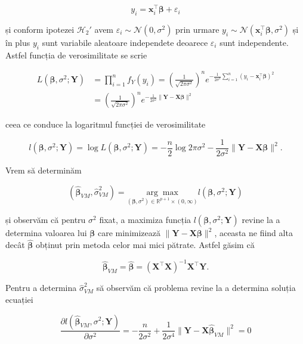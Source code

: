 \documentclass[]{article}
\begin{document}
\[
  y_i = \boldsymbol x_i^\intercal\boldsymbol\beta + \varepsilon_i
\]

și conform ipotezei \(\mathcal{H}_2'\) avem
\(\varepsilon_i\sim\mathcal{N}(0, \sigma^2)\) prin urmare
\(y_i\sim\mathcal{N}(\boldsymbol x_i^\intercal\boldsymbol\beta, \sigma^2)\)
și în plus \(y_i\) sunt variabile aleatoare independete deoarece
\(\varepsilon_i\) sunt independente. Astfel funcția de verosimilitate se
scrie

\begin{align*}
  L(\boldsymbol\beta, \sigma^2;\boldsymbol Y) &= \prod_{i = 1}^{n}f_{Y}(y_i) = \left(\frac{1}{\sqrt{2\pi\sigma^2}}\right)^n e^{-\frac{1}{2\sigma^2}\sum_{i = 1}^{n}(y_i - \boldsymbol x_i^\intercal\boldsymbol\beta)^2} \\
  &= \left(\frac{1}{\sqrt{2\pi\sigma^2}}\right)^n e^{-\frac{1}{2\sigma^2}\lVert\boldsymbol Y - \boldsymbol X\boldsymbol\beta\rVert^2}
\end{align*}

ceea ce conduce la logaritmul funcției de verosimilitate

\[
  l(\boldsymbol\beta, \sigma^2;\boldsymbol Y) = \log  L(\boldsymbol\beta, \sigma^2;\boldsymbol Y) = -\frac{n}{2}\log{2\pi\sigma^2} -\frac{1}{2\sigma^2}\lVert\boldsymbol Y - \boldsymbol X\boldsymbol\beta\rVert^2.
\]

Vrem să determinăm

\[
  (\hat{\boldsymbol\beta}_{VM}, \hat{\sigma}_{VM}^2) = \underset{(\boldsymbol\beta, \sigma^2)\in\mathbb{R}^{p+1}\times(0,\infty)}{\arg\max} l(\boldsymbol\beta, \sigma^2;\boldsymbol Y)
\]

și observăm că pentru \(\sigma^2\) fixat, a maximiza funcția
\(l(\boldsymbol\beta, \sigma^2;\boldsymbol Y)\) revine la a determina
valoarea lui \(\boldsymbol\beta\) care minimizează
\(\lVert\boldsymbol Y - \boldsymbol X\boldsymbol\beta\rVert^2\), aceasta
ne fiind alta decât \(\hat{\boldsymbol\beta}\) obținut prin metoda celor
mai mici pătrate. Astfel găsim că

\[
  \hat{\boldsymbol\beta}_{VM} = \hat{\boldsymbol\beta} = (\boldsymbol{X}^\intercal \boldsymbol X)^{-1}\boldsymbol{X}^\intercal \boldsymbol Y.
\]

Pentru a determina \(\hat{\sigma}_{VM}^2\) să observăm că problema
revine la a determina soluția ecuației

\[
  \frac{\partial l(\hat{\boldsymbol\beta}_{VM}, \sigma^2;\boldsymbol Y)}{\partial \sigma^2} = -\frac{n}{2\sigma^2} + \frac{1}{2\sigma^4}\lVert\boldsymbol Y - \boldsymbol X\hat{\boldsymbol\beta}_{VM}\rVert^2 = 0
\]
\end{document}
